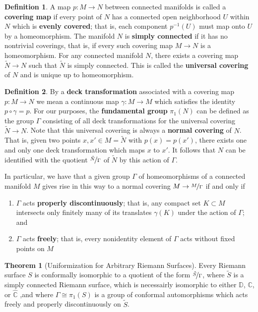 \documentclass{article}
\theoremstyle{definition}
\newtheorem{theorem}{Theorem}
\newtheorem*{defn}{Definition}
\begin{document}
    \begin{defn}
        A map $p:M\to N$ between connected manifolds is called a \textbf{covering map} if every point of $N$ has a connected
        open neighborhood $U$ within $N$ which is \textbf{evenly covered}; that is, each component $p^{-1}(U)$ must map onto
        $U$ by a homeomorphism. The manifold $N$ is \textbf{simply connected} if it has no nontrivial coverings, that is,
        if every such covering map $M\to N$ is a homeomorphism. For any connected manifold $N$, there exists a covering map
        $\tilde{N}\to N$ such that $\tilde{N}$ is simply connected. This is called the \textbf{universal covering} of $N$
        and is unique up to homeomorphism.
    \end{defn}

    \begin{defn}
        By a \textbf{deck transformation} associated with a covering map $p: M\to N$ we mean a continuous map $\gamma: M\to M$ which
        satisfies the identity $p\circ\gamma = p$. For our purposes, the \textbf{fundamental group} $\pi_1(N)$ can be defined as
        the group $\Gamma$ consisting of all deck transformations for the universal covering $\tilde{N}\to N$. Note that this
        universal covering is always a \textbf{normal covering} of $N$. That is, given two points $x,x'\in M=\tilde{N}$ with
        $p(x)=p(x')$, there exists one and only one deck transformation which maps $x$ to $x'$. It follows that $N$ can be identified
        with the quotient $\nicefrac{\tilde{N}}{\Gamma}$ of $\tilde{N}$ by this action of $\Gamma$.
    \end{defn}

    In particular, we have that a given group $\Gamma$ of homeomorphisms of a connected manifold $M$ gives rise in this way
    to a normal covering $M\to \nicefrac{M}{\Gamma}$ if and only if
    \begin{enumerate}
        \item $\Gamma$ acts \textbf{properly discontinuously}; that is, any compact set $K\subset M$ intersects only finitely
            many of its translates $\gamma(K)$ under the action of $\Gamma$; and
        \item $\Gamma$ acts \textbf{freely}; that is, every nonidentity element of $\Gamma$ acts without fixed points on $M$
    \end{enumerate}

    \begin{theorem}[Uniformization for Arbitrary Riemann Surfaces]
        Every Riemann surface $S$ is conformally isomorphic to a quotient of the form $\nicefrac{\tilde{S}}{\Gamma}$, where
        $\tilde{S}$ is a simply connected Riemann surface, which is necessairly isomorphic to either $\mathbb{D}$, $\mathbb{C}$,
        or $\hat{\mathbb{C}}$ ,and where $\Gamma\cong\pi_1(S)$ is a group of conformal automorphisms which acts freely and properly
        discontinuously on $\tilde{S}$.
    \end{theorem}
\end{document}
